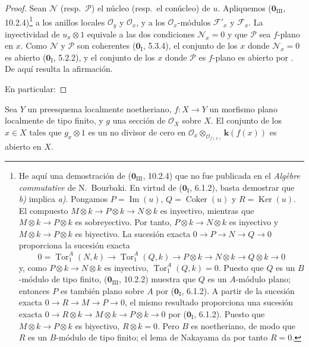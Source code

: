 \begin{proof}
Sean $\mathcal N$ (resp.\ $\mathcal P$) el núcleo (resp.\ el conúcleo) de $u$.
Apliquemos ($\mathbf 0_{\mathrm{III}}$, 10.2.4)\footnote{He aquí una demostración de
($\mathbf 0_{\mathrm{III}}$, 10.2.4) que no fue publicada en el
\emph{Algèbre commutative} de N.~Bourbaki. En virtud de
($\mathbf 0_{\mathrm I}$, 6.1.2), basta demostrar que \emph{b)} implica \emph{a)}.
Pongamos $P=\operatorname{Im}(u)$,
$Q=\operatorname{Coker}(u)$ y
$R=\operatorname{Ker}(u)$. El compuesto
$M\otimes k\to P\otimes k\to N\otimes k$ es
inyectivo, mientras que $M\otimes k\to P\otimes k$ es
sobreyectivo. Por tanto, $P\otimes k\to N\otimes k$ es
inyectivo y $M\otimes k\to P\otimes k$ es biyectivo.
La sucesión exacta $0\to P\to N\to Q\to0$ proporciona
la sucesión exacta
\[
0=\operatorname{Tor}_1^A(N,k)\to\operatorname{Tor}_1^A(Q,k)
\to P\otimes k\to N\otimes k\to Q\otimes k\to0
\]
y, como $P\otimes k\to N\otimes k$ es inyectivo,
$\operatorname{Tor}_1^A(Q,k)=0$. Puesto que $Q$ es un
$B$-módulo de tipo finito,
($\mathbf 0_{\mathrm{III}}$, 10.2.2) muestra que $Q$ es un $A$-módulo plano; entonces $P$ es también plano sobre $A$ por
($\mathbf 0_{\mathrm I}$, 6.1.2). A partir de la sucesión exacta
$0\to R\to M\to P\to0$, el mismo resultado proporciona una
sucesión exacta
$0\to R\otimes k\to M\otimes k\to P\otimes k\to0$ por ($\mathbf 0_{\mathrm I}$, 6.1.2). Puesto que $M\otimes k\to P\otimes k$ es biyectivo,
$R\otimes k=0$. Pero $B$ es noetheriano, de modo que
$R$ es un $B$-módulo de tipo finito; el lema de Nakayama
da por tanto $R=0$.}
a los anillos locales $\mathcal O_y$ y $\mathcal O_x$, y a los
$\mathcal O_x$-módulos $\mathcal F'_x$ y $\mathcal F_x$. La inyectividad de
$u_x\otimes1$ equivale a las dos condiciones
$\mathcal N_x=0$ y que $\mathcal P$ sea $f$-plano en $x$. Como
$\mathcal N$ y $\mathcal P$ son coherentes ($\mathbf 0_{\mathrm I}$, 5.3.4),
el conjunto de los $x$ donde $\mathcal N_x=0$ es abierto
($\mathbf 0_{\mathrm I}$, 5.2.2), y el conjunto de los $x$ donde $\mathcal P$ es
$f$-plano es abierto por . De aquí resulta la afirmación.

En particular:
\end{proof}

\begin{corollary}[11.1.3]
\label{IV.11.1.3}
Sea $Y$ un preesquema localmente noetheriano,
$f:X\to Y$ un morfismo plano localmente de tipo finito, y
$g$ una sección de $\mathcal O_X$ sobre $X$. El conjunto de los
$x\in X$ tales que $g_x\otimes1$ es un no divisor de cero en
$\mathcal O_x\otimes_{\mathcal O_{f(x)}}\boldsymbol{k}(f(x))$ es abierto en
$X$.
\end{corollary}


